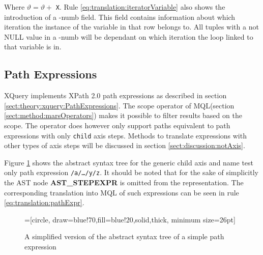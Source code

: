Where $\vartheta = \vartheta + $ \texttt{X}.
Rule \ref{eq:translation:iteratorVariable} also shows the introduction of a -\textsf{numb} field. This field
contains information about which iteration the instance of the variable in that row belongs to. All tuples with a
not \textsf{NULL} value in a -\textsf{numb} will be dependant on which iteration the loop linked to that variable
is in.


\subsection{Path Expressions}
\label{sect:translation:mXr:smpPathExpr}
XQuery implements XPath 2.0 path expressions as described in section
\ref{sect:theory:xquery:PathExpressions}. The \textsf{scope} operator of
MQL(section \ref{sect:method:marsOperators}) makes it possible to
filter results based on the scope. The operator does however only support paths
equivalent to path expressions with only \texttt{child} axis steps. Methods to
translate expressions with other types of axis steps will be discussed in
section \ref{sect:discussion:notAxis}.

Figure \ref{fig:translation:pathAST} shows the abstract syntax tree for the
generic child axis and name test only path expression \texttt{/a/\ldots/y/z}. It
should be noted that for the sake of simplicitly the AST node \textbf{AST\_STEPEXPR} is
omitted from the representation. The corresponding translation into MQL of such
expressions can be seen in rule \ref{eq:translation:pathExpr}.


\begin{figure}[h]
\centering
{}=[circle, draw=blue!70,fill=blue!20,solid,thick, minimum
size=26pt]
\label{fig:translation:pathAST}
\caption[AST of path expression]{A simplified version of the abstract syntax
tree of a simple path expression}
\end{figure}


